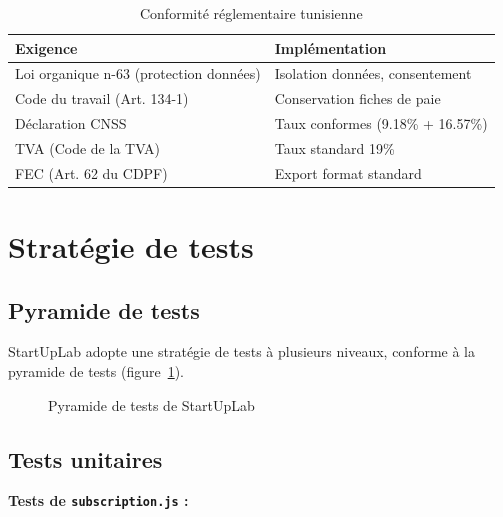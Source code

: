 \begin{table}[H]
\centering
\caption{Conformité réglementaire tunisienne}
\label{tab:conformite}
\begin{tabular}{|l|l|}
\hline
\textbf{Exigence} & \textbf{Implémentation} \\
\hline
Loi organique n\degre 2004-63 (protection données) & Isolation données, consentement \\
\hline
Code du travail (Art. 134-1) & Conservation fiches de paie \\
\hline
Déclaration CNSS & Taux conformes (9.18\% + 16.57\%) \\
\hline
TVA (Code de la TVA) & Taux standard 19\% \\
\hline
FEC (Art. 62 du CDPF) & Export format standard \\
\hline
\end{tabular}
\end{table}

\section{Stratégie de tests}

\subsection{Pyramide de tests}

StartUpLab adopte une stratégie de tests à plusieurs niveaux, conforme à la pyramide de tests (figure~\ref{fig:test-pyramid}).

\begin{figure}[H]
\centering
{}
\caption{Pyramide de tests de StartUpLab}
\label{fig:test-pyramid}
\end{figure}

\subsection{Tests unitaires}

\textbf{Tests de \texttt{subscription.js} :}

